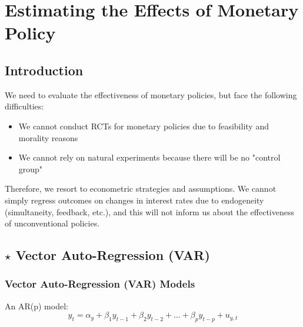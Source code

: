 \chapter[Estimating the Effects of Monetary Policy]{Estimating the Effects of Monetary Policy\raisebox{.3\baselineskip}{\normalsize\footnotemark}}


\section{Introduction}

    We need to evaluate the effectiveness of monetary policies, but face the following difficulties:
    
    \begin{itemize}
        \item We cannot conduct RCTs for monetary policies due to feasibility and morality reasons
        \item We cannot rely on natural experiments because there will be no "control group"
    \end{itemize}

    Therefore, we resort to econometric strategies and assumptions. We cannot simply regress outcomes on changes in interest rates due to endogeneity (simultaneity, feedback, etc.), and this will not inform us about the effectiveness of unconventional policies.

\section{$\star$ Vector Auto-Regression (VAR)}

    \subsection{Vector Auto-Regression (VAR) Models}

        An AR(p) model:
        \begin{equation*}
            y_t = \alpha_y + \beta_1 y_{t-1} + \beta_2 y_{t-2} + \dots + \beta_p y_{t-p} + u_{y,t}
        \end{equation*}


